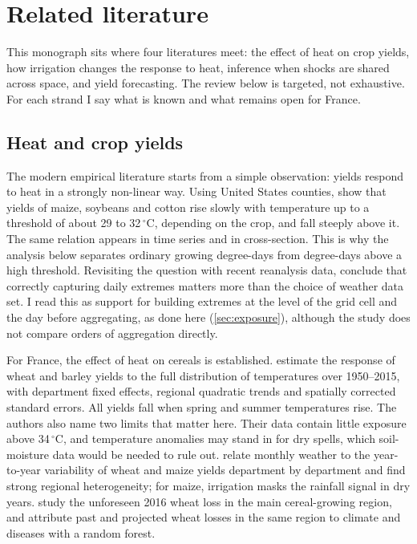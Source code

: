 \section{Related literature}
\label{sec:literature}

This monograph sits where four literatures meet: the effect of heat on crop yields, how irrigation changes the response to heat, inference when shocks are shared across space, and yield forecasting. The review below is targeted, not exhaustive. For each strand I say what is known and what remains open for France.

\subsection{Heat and crop yields}

The modern empirical literature starts from a simple observation: yields respond to heat in a strongly non-linear way. Using United States counties, \textcite{schlenker2009} show that yields of maize, soybeans and cotton rise slowly with temperature up to a threshold of about 29 to 32\,$^{\circ}$C, depending on the crop, and fall steeply above it. The same relation appears in time series and in cross-section. This is why the analysis below separates ordinary growing degree-days from degree-days above a high threshold. Revisiting the question with recent reanalysis data, \textcite{hogan2024} conclude that correctly capturing daily extremes matters more than the choice of weather data set. I read this as support for building extremes at the level of the grid cell and the day before aggregating, as done here (\cref{sec:exposure}), although the study does not compare orders of aggregation directly.

For France, the effect of heat on cereals is established. \textcite{gammans2017} estimate the response of wheat and barley yields to the full distribution of temperatures over 1950--2015, with department fixed effects, regional quadratic trends and spatially corrected standard errors. All yields fall when spring and summer temperatures rise. The authors also name two limits that matter here. Their data contain little exposure above 34\,$^{\circ}$C, and temperature anomalies may stand in for dry spells, which soil-moisture data would be needed to rule out. \textcite{ceglar2016} relate monthly weather to the year-to-year variability of wheat and maize yields department by department and find strong regional heterogeneity; for maize, irrigation masks the rainfall signal in dry years. \textcite{benari2018} study the unforeseen 2016 wheat loss in the main cereal-growing region, and \textcite{noiajunior2025} attribute past and projected wheat losses in the same region to climate and diseases with a random forest.

